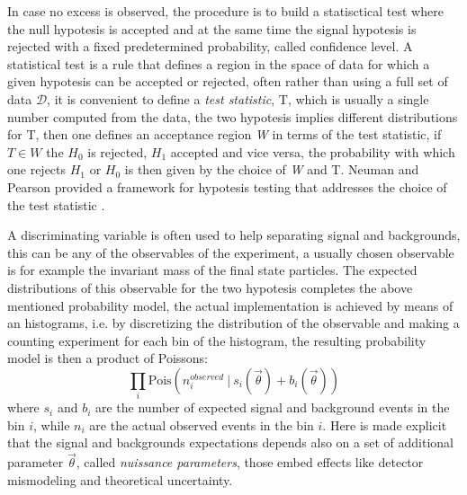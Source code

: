 In case no excess is observed, the procedure is to build a statisctical test where the 
null hypotesis is accepted and at the same time the signal hypotesis
is rejected with a fixed predetermined probability, called confidence level.
A statistical test is a rule that defines a region in the space of data for which
a given hypotesis can be accepted or rejected, often rather than using a full set 
of data $\mathcal{D}$, it is convenient to define a \emph{test statistic}, T, which is usually a single
number computed from the data, the two hypotesis implies different distributions for T, 
then one defines an acceptance region \emph{W} in terms of the test statistic, if 
$T \in W$ the $H_{0}$ is rejected, $H_{1}$ accepted and vice versa,
the probability with which one rejects $H_{1}$ or $H_{0}$ is then given by the choice of
\emph{W} and T. Neuman and Pearson provided a framework for hypotesis testing that addresses the 
choice of the test statistic \cite{NP}.

A discriminating variable is often used to help separating signal and backgrounds, this can be any of the observables of
the experiment, a usually chosen observable is for example the invariant mass of the final state particles. The expected
distributions of this observable for the two hypotesis completes the above
mentioned probability model, the actual implementation is achieved by means of an histograms, 
i.e. by discretizing the distribution of the observable and making a counting experiment
for each bin of the histogram, the resulting probability model is then a product of Poissons: 
\begin{equation}\label{markedpoisson}
\prod_i \text{Pois}(n_i^{observed} ~ | ~ s_i(\vec{\theta}) + b_i(\vec{\theta})) 
\end{equation}
where $s_i$ and $b_i$ are  the number of expected signal and background events in the bin $i$, while $n_i$ are the
actual observed events in the bin $i$. Here is made explicit that the signal and backgrounds expectations
depends also on a set of additional parameter $\vec{\theta}$, called \emph{nuissance parameters}, 
those embed effects like detector mismodeling and theoretical uncertainty.


